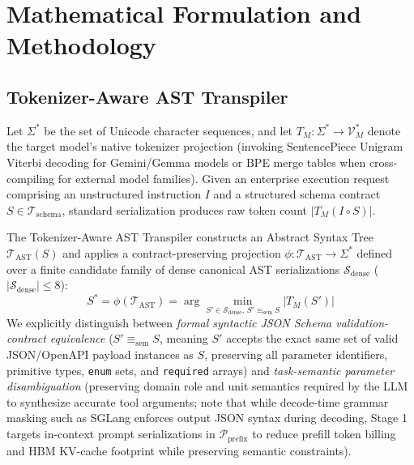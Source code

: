 \documentclass[conference,10pt]{IEEEtran}
\begin{document}
\section{Mathematical Formulation and Methodology}
\label{sec:methodology}

\subsection{Tokenizer-Aware AST Transpiler}
Let $\Sigma^*$ be the set of Unicode character sequences, and let $T_M : \Sigma^* \to \mathcal{V}_M^*$ denote the target model's native tokenizer projection (invoking SentencePiece Unigram Viterbi decoding for Gemini/Gemma models \cite{kudo2018unigram, gemini2024} or BPE merge tables when cross-compiling for external model families). Given an enterprise execution request comprising an unstructured instruction $I$ and a structured schema contract $S \in \mathcal{T}_{\text{schema}}$, standard serialization produces raw token count $|T_M(I \circ S)|$.

The Tokenizer-Aware AST Transpiler constructs an Abstract Syntax Tree $\mathcal{T}_{\text{AST}}(S)$ and applies a contract-preserving projection $\phi : \mathcal{T}_{\text{AST}} \to \Sigma^*$ defined over a finite candidate family of dense canonical AST serializations $\mathcal{S}_{\text{dense}}$ ($|\mathcal{S}_{\text{dense}}| \le 8$):
\begin{equation}
\label{eq:ast_min}
S^* = \phi(\mathcal{T}_{\text{AST}}) = \arg\min_{S' \in \mathcal{S}_{\text{dense}},\, S' \equiv_{\text{sem}} S} |T_M(S')|
\end{equation}
We explicitly distinguish between \textit{formal syntactic JSON Schema validation-contract equivalence} ($S' \equiv_{\text{sem}} S$, meaning $S'$ accepts the exact same set of valid JSON/OpenAPI payload instances as $S$, preserving all parameter identifiers, primitive types, \texttt{enum} sets, and \texttt{required} arrays) and \textit{task-semantic parameter disambiguation} (preserving domain role and unit semantics required by the LLM to synthesize accurate tool arguments; note that while decode-time grammar masking such as SGLang \cite{zheng2024sglang} enforces output JSON syntax during decoding, Stage 1 targets in-context prompt serializations in $\mathcal{P}_{\text{prefix}}$ to reduce prefill token billing and HBM KV-cache footprint while preserving semantic constraints).
\end{document}
